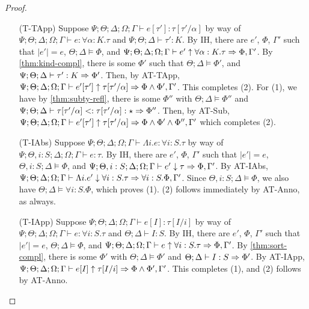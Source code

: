 \begin{proof}
\begin{itemize}
  \item[(T-TApp)] Suppose
  $\Psi ; \Theta ; \Delta ; \Omega ; \Gamma \vdash e [\tau'] : \tau[\tau'/\alpha]$ by way of
  $\Psi ; \Theta ; \Delta ; \Omega ; \Gamma \vdash e : \forall \alpha : K.\tau$ and
  $\Psi ; \Theta ; \Delta \vdash \tau' : K$.
  By IH, there are $e'$, $\Phi$, $\Gamma'$ such that
  $|e'| = e$,
  $\Theta ; \Delta \vDash \Phi$, and
  $\Psi ; \Theta ; \Delta ; \Omega ; \Gamma \vdash e' \uparrow \forall \alpha : K.\tau \Rightarrow \Phi,\Gamma'$.
  By \autoref{thm:kind-compl}, there is some $\Phi'$ such that
  $\Theta ; \Delta \vDash \Phi'$, and
  $\Psi ; \Theta ; \Delta \vdash \tau' : K \Rightarrow \Phi'$.
  Then, by AT-TApp,
  $\Psi ; \Theta ; \Delta ; \Omega ; \Gamma \vdash e' [\tau'] \uparrow \tau[\tau'/\alpha] \Rightarrow \Phi \wedge \Phi',\Gamma'$.
  This completes (2). For (1), we have
  by \autoref{thm:subty-refl}, there is some $\Phi''$ with
  $\Theta ; \Delta \vDash \Phi''$ and
  $\Psi ; \Theta ; \Delta \vdash \tau[\tau'/\alpha] <: \tau[\tau'/\alpha] : \star \Rightarrow \Phi''$.
  Then, by AT-Sub,
  $\Psi ; \Theta ; \Delta ; \Omega ; \Gamma \vdash e' [\tau'] \uparrow \tau[\tau'/\alpha] \Rightarrow \Phi \wedge \Phi' \wedge \Phi'',\Gamma'$
  which completes (2).
  \item[(T-IAbs)] Suppose
  $\Psi ; \Theta ; \Delta ; \Omega ; \Gamma \vdash \Lambda i. e : \forall i : S. \tau$ by way of
  $\Psi ; \Theta, i : S ; \Delta ; \Omega ; \Gamma \vdash e : \tau$.
  By IH, there are $e'$, $\Phi$, $\Gamma'$ such that
  $|e'| = e$,
  $\Theta, i : S ; \Delta \vDash \Phi$, and
  $\Psi ; \Theta, i : S ; \Delta ; \Omega; \Gamma \vdash e' \downarrow \tau \Rightarrow \Phi,\Gamma'$.
  By AT-IAbs,
  $\Psi ; \Theta ; \Delta ; \Omega; \Gamma \vdash \Lambda i. e' \downarrow \forall i : S.\tau \Rightarrow \forall i : S.\Phi,\Gamma'$.
  Since $\Theta, i : S ; \Delta \vDash \Phi$, we also have $\Theta ; \Delta \vDash \forall i : S. \Phi$, which proves (1).
  (2) follows immediately by AT-Anno, as always.
  
  
  \item[(T-IApp)] Suppose
  $\Psi ; \Theta ; \Delta ; \Omega ; \Gamma \vdash e [I] : \tau[I/i]$ by way of
  $\Psi ; \Theta ; \Delta ; \Omega ; \Gamma \vdash e : \forall i : S.\tau$ and
  $\Theta ; \Delta \vdash I : S$.
  By IH, there are $e'$, $\Phi$, $\Gamma'$ such that
  $|e'| = e$,
  $\Theta ; \Delta \vDash \Phi$, and
  $\Psi ; \Theta ; \Delta ; \Omega; \Gamma \vdash e \uparrow \forall i : S. \tau \Rightarrow \Phi,\Gamma'$.
  By \autoref{thm:sort-compl}, there is some $\Phi'$ with
  $\Theta ; \Delta \vDash \Phi'$ and
  $\Theta ; \Delta \vdash I : S \Rightarrow \Phi'$.
  By AT-IApp,
  $\Psi ; \Theta ; \Delta ; \Omega; \Gamma \vdash e [I] \uparrow \tau[I/i] \Rightarrow \Phi \wedge \Phi',\Gamma'$.
  This completes (1), and (2) follows by AT-Anno.
  

\end{itemize}
\end{proof}
